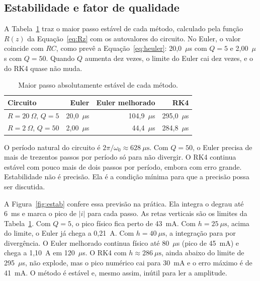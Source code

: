 \subsection{Estabilidade e fator de qualidade}

A Tabela~\ref{tab:hestab} traz o maior passo estável de cada método, calculado pela função \(R(z)\) da Equação~\eqref{eq:Rz} com os autovalores do circuito. No Euler, o valor coincide com \(RC\), como prevê a Equação~\eqref{eq:heuler}: 20,0~\(\mu\)s com \(Q=5\) e 2,00~\(\mu\)s com \(Q=50\). Quando \(Q\) aumenta dez vezes, o limite do Euler cai dez vezes, e o do RK4 quase não muda.

\begin{table}[htbp]
\centering
\caption{Maior passo absolutamente estável de cada método.}
\label{tab:hestab}
\small
\begin{tabular}{@{}lrrr@{}}
\toprule
Circuito & Euler & Euler melhorado & RK4 \\
\midrule
\(R=20~\Omega\), \(Q=5\) & 20{,}0~\(\mu\)s & 104{,}9~\(\mu\)s & 295{,}0~\(\mu\)s \\
\(R=2~\Omega\), \(Q=50\) & 2{,}00~\(\mu\)s & 44{,}4~\(\mu\)s & 284{,}8~\(\mu\)s \\
\bottomrule
\end{tabular}
\end{table}

O período natural do circuito é \(2\pi/\omega_0\approx 628~\mu\mathrm{s}\). Com \(Q=50\), o Euler precisa de mais de trezentos passos por período só para não divergir. O RK4 continua estável com pouco mais de dois passos por período, embora com erro grande. Estabilidade não é precisão. Ela é a condição mínima para que a precisão possa ser discutida.

A Figura~\ref{fig:estab} confere essa previsão na prática. Ela integra o degrau até 6~ms e marca o pico de \(|i|\) para cada passo. As retas verticais são os limites da Tabela~\ref{tab:hestab}. Com \(Q=5\), o pico físico fica perto de 43~mA. Com \(h=25~\mu\mathrm{s}\), acima do limite, o Euler já chega a 0,21~A. Com \(h=40~\mu\mathrm{s}\), a integração para por divergência. O Euler melhorado continua físico até 80~\(\mu\)s (pico de 45~mA) e chega a 1,10~A em 120~\(\mu\)s. O RK4 com \(h\approx 286~\mu\mathrm{s}\), ainda abaixo do limite de 295~\(\mu\)s, não explode, mas o pico numérico cai para 30~mA e o erro máximo é de 41~mA. O método é estável e, mesmo assim, inútil para ler a amplitude.

